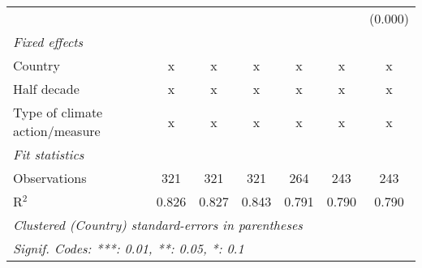 \begin{tabular}{lcccccc}
                                                  &         &         &                &                &                & (0.000)\\   
   \emph{Fixed effects}\\
   Country                                        & x       & x       & x              & x              & x              & x\\  
   Half decade                                    & x       & x       & x              & x              & x              & x\\  
   Type of climate action/measure                 & x       & x       & x              & x              & x              & x\\  
   \midrule \emph{Fit statistics}\\
   Observations                                   & 321     & 321     & 321            & 264            & 243            & 243\\  
   R$^2$                                          & 0.826   & 0.827   & 0.843          & 0.791          & 0.790          & 0.790\\  
   \midrule
   \multicolumn{7}{l}{\emph{Clustered (Country) standard-errors in parentheses}}\\
   \multicolumn{7}{l}{\emph{Signif. Codes: ***: 0.01, **: 0.05, *: 0.1}}\\
\end{tabular}
\par\endgroup


